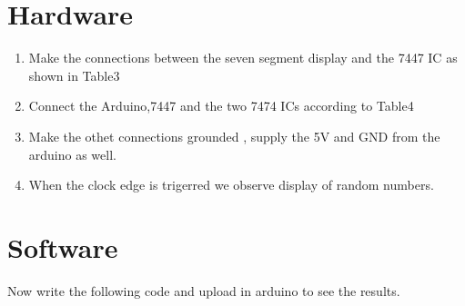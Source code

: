 \documentclass[10pt,a4paper]{article}
\begin{document}
\section{Hardware}
\begin{enumerate}
\item Make the connections between the seven segment display and the 7447 IC as shown in Table3
\newline\newline

\item Connect the Arduino,7447 and the two 7474 ICs according to Table4
\newline\newline

\item Make the othet connections grounded , supply the 
5V and GND from the arduino as well.\\
\item When the clock edge is trigerred we observe display of random numbers.
\end{enumerate}
\section{Software}
Now write the following code and upload in arduino to see the results.
\newline\newline

\end{document}
